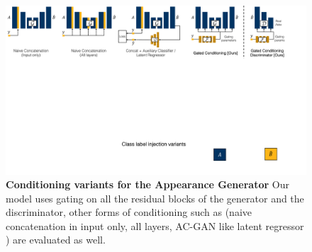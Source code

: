 \vspace{-4mm}
\begin{figure}[t]
    \centering
    \includegraphics[width=1.\linewidth]{paper_images/arch_inject2.pdf}
    \vspace{-6mm}
    \caption{
    {\bf Conditioning variants for the Appearance Generator} Our model uses gating on all the residual blocks of the generator and the discriminator, other forms of conditioning such as (naive concatenation in input only, all layers, AC-GAN like latent regressor \cite{odena2016conditional}) are evaluated as well. \label{fig:arch-gate1}
    }
\end{figure}

